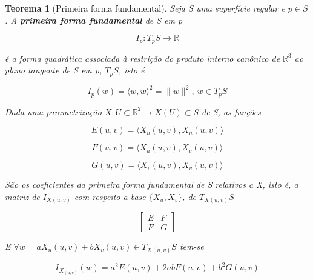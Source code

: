 \documentclass[12pt]{article}
\newtheorem{theorem}{Teorema}
\begin{document}
\begin{theorem}[Primeira forma fundamental]
Seja S uma superfície regular e $p \in S$. A \textbf{primeira forma fundamental} de S em p

$$I_p : T_p S \rightarrow \mathbb{R}$$

é a forma quadrática associada à restrição do produto interno canônico de $\mathbb{R}^3$ ao plano tangente de S em p, $T_p S$, isto é

$$I_p(w) = \langle w,w \rangle^2 = \| w \|^2,\ w \in T_p S$$

Dada uma parametrização $X: U \subset \mathbb{R}^2 \rightarrow X(U) \subset S$ de S, as funções


\begin{equation*}
    E(u, v) = \langle X_u(u, v), X_u(u, v) \rangle
\end{equation*}

\begin{equation*}
    F(u, v) = \langle X_u(u, v), X_v(u, v) \rangle
\end{equation*}

\begin{equation*}
    G(u, v) = \langle X_v(u, v), X_v(u, v) \rangle
\end{equation*}

São os coeficientes da primeira forma fundamental de S relativos a X, isto é, a matriz de $I_{X(u, v)}$ com respeito a base $\{X_u, X_v\}$, de $T_{X(u, v)} S$

$$
\begin{bmatrix}
E & F\\
F & G
\end{bmatrix}
$$

E $\forall w = a X_u(u, v) + b X_v(u, v) \in T_{X(u, v)} S$ tem-se

$$I_{X_{(u, v)}}(w) = a^2 E(u, v) + 2 a b F(u, v) + b^2 G(u, v)$$
\end{theorem}

\vspace{3mm}
\end{document}
